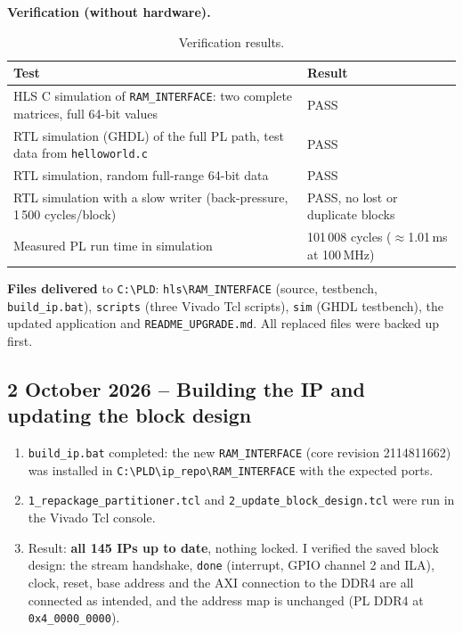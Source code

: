 \documentclass[11pt,a4paper]{article}
\newcommand{\code}[1]{\texttt{#1}}
\begin{document}
\textbf{Verification (without hardware).}
\begin{table}[H]
\centering
\begin{tabularx}{\textwidth}{@{}Yl@{}}
\toprule
\textbf{Test} & \textbf{Result} \\
\midrule
HLS C simulation of \code{RAM\_INTERFACE}: two complete matrices, full 64-bit values & PASS \\
RTL simulation (GHDL) of the full PL path, test data from \code{helloworld.c} & PASS \\
RTL simulation, random full-range 64-bit data & PASS \\
RTL simulation with a slow writer (back-pressure, 1\,500 cycles/block) & PASS, no lost or duplicate blocks \\
Measured PL run time in simulation & 101\,008 cycles ($\approx$1.01\,ms at 100\,MHz) \\
\bottomrule
\end{tabularx}
\caption{Verification results.}
\end{table}

\textbf{Files delivered} to \code{C:\textbackslash PLD}: \code{hls\textbackslash RAM\_INTERFACE} (source, testbench, \code{build\_ip.bat}), \code{scripts} (three Vivado Tcl scripts), \code{sim} (GHDL testbench), the updated application and \code{README\_UPGRADE.md}. All replaced files were backed up first.

\subsection{2 October 2026 -- Building the IP and updating the block design}
\begin{enumerate}
  \item \code{build\_ip.bat} completed: the new \code{RAM\_INTERFACE} (core revision 2114811662) was installed in \code{C:\textbackslash PLD\textbackslash ip\_repo\textbackslash RAM\_INTERFACE} with the expected ports.
  \item \code{1\_repackage\_partitioner.tcl} and \code{2\_update\_block\_design.tcl} were run in the Vivado Tcl console.
  \item Result: \textbf{all 145 IPs up to date}, nothing locked. I verified the saved block design: the stream handshake, \code{done} (interrupt, GPIO channel 2 and ILA), clock, reset, base address and the AXI connection to the DDR4 are all connected as intended, and the address map is unchanged (PL DDR4 at \code{0x4\_0000\_0000}).
\end{enumerate}
\end{document}
